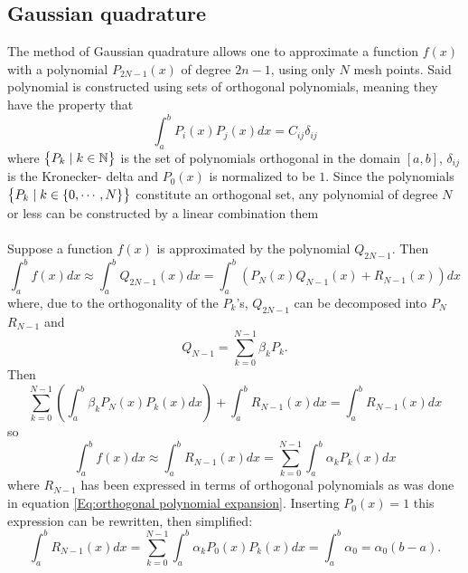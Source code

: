 \documentclass[10pt,a4paper]{article}
\begin{document}
\subsection{Gaussian quadrature}
The method of Gaussian quadrature allows one to approximate a function $f(x)$ with a polynomial $P_{2N-1}(x)$ of degree $2n-1$, using only $N$ mesh points. Said polynomial is constructed using sets of orthogonal polynomials, meaning they have the property that
\begin{equation}
\int_a^b P_i(x)P_j(x)dx = C_{ij}\delta_{ij}
\end{equation}
where $\big\{ P_k\hspace{1mm}|\hspace{1mm} k \in \mathbb N \big\}$ is the set of polynomials orthogonal in the domain $[a,b]$, $\delta_{ij}$ is the Kronecker- delta and $P_0(x)$ is normalized to be $1$. Since the polynomials $\big\{ P_k\hspace{1mm}|\hspace{1mm} k \in \{0,\cdots ,N\} \big\}$ constitute an orthogonal set, any polynomial of degree $N$ or less can be constructed by a linear combination them\\\\Suppose a function $f(x)$ is approximated by the polynomial $Q_{2N-1}$. Then
\begin{equation}\label{Eq:Poly approximation}
\int_{a}^bf(x)dx \approx \int_{a}^bQ_{2N-1}(x)dx=\int_{a}^b\left(P_N(x)Q_{N-1}(x)+R_{N-1}(x)\right)dx
\end{equation}
where, due to the orthogonality of the $P_k$'s, $Q_{2N-1}$ can be decomposed into $P_N$ $R_{N-1}$ and 
\begin{equation}\label{Eq:orthogonal polynomial expansion}
Q_{N-1} = \sum\limits_{k=0}^{N-1} \beta_k P_k.
\end{equation}
Then
$$
\sum\limits_{k=0}^{N-1} \left( \int_{a}^b \beta_k P_N(x) P_k(x)dx \right)+\int_{a}^bR_{N-1}(x)dx = \int_{a}^bR_{N-1}(x)dx
$$
so
\begin{equation*}
\int_{a}^bf(x)dx \approx \int_{a}^bR_{N-1}(x)dx = \sum\limits_{k=0}^{N-1}  \int_{a}^b \alpha_k P_k(x)dx
\end{equation*}
where $R_{N-1}$ has been expressed in terms of orthogonal polynomials as was done in equation \ref{Eq:orthogonal polynomial expansion}.
Inserting $P_0(x) = 1$ this expression can be rewritten, then simplified:
\begin{equation}\label{Eq: integral as a function of a0}
\int_{a}^bR_{N-1}(x)dx = \sum\limits_{k=0}^{N-1}  \int_{a}^b \alpha_kP_0(x) P_k(x)dx = \int_{a}^b \alpha_0 = \alpha_0(b-a).
\end{equation}
\end{document}
